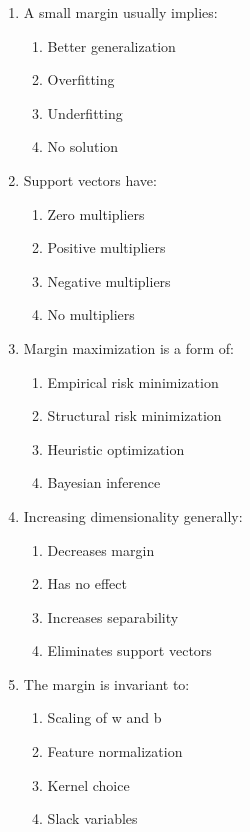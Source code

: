 \documentclass{article}
\begin{document}
\begin{enumerate}
		\item A small margin usually implies:
		\begin{enumerate}
			\item Better generalization
			\item Overfitting
			\item Underfitting
			\item No solution
		\end{enumerate}
		
		\item Support vectors have:
		\begin{enumerate}
			\item Zero multipliers
			\item Positive multipliers
			\item Negative multipliers
			\item No multipliers
		\end{enumerate}
		
		\item Margin maximization is a form of:
		\begin{enumerate}
			\item Empirical risk minimization
			\item Structural risk minimization
			\item Heuristic optimization
			\item Bayesian inference
		\end{enumerate}
		
		\item Increasing dimensionality generally:
		\begin{enumerate}
			\item Decreases margin
			\item Has no effect
			\item Increases separability
			\item Eliminates support vectors
		\end{enumerate}
		
		\item The margin is invariant to:
		\begin{enumerate}
			\item Scaling of w and b
			\item Feature normalization
			\item Kernel choice
			\item Slack variables
		\end{enumerate}
	\end{enumerate}
	
\end{document}
